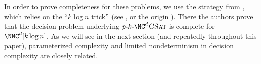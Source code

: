In order to prove completeness for these problems, we use the strategy from \autocite[Theorem~3.6]{cc97lim}, which relies on the ``$k \log n$ trick'' (see \autocite[Corollary~3.13]{fg06}, or the origin \autocite{adf95}).
There the authors prove that the decision problem underlying $\pNCSAT$ is complete for $\NNC^d[k \log n]$.
As we will see in the next section (and repeatedly throughout this paper), parameterized complexity and limited nondeterminism in decision complexity are closely related.

